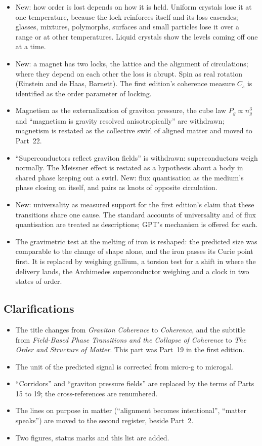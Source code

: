\documentclass[11pt,a4paper]{article}
\begin{document}
\begin{itemize}
\item New: how order is lost depends on how it is held. Uniform crystals lose it at one temperature, because the lock reinforces itself and its loss cascades; glasses, mixtures, polymorphs, surfaces and small particles lose it over a range or at other temperatures. Liquid crystals show the levels coming off one at a time.
\item New: a magnet has two locks, the lattice and the alignment of circulations; where they depend on each other the loss is abrupt. Spin as real rotation (Einstein and de Haas, Barnett). The first edition's coherence measure $C_s$ is identified as the order parameter of locking.
\item Magnetism as the externalization of graviton pressure, the cube law $P_g\propto n_g^3$ and ``magnetism is gravity resolved anisotropically'' are withdrawn; magnetism is restated as the collective swirl of aligned matter and moved to Part~22.
\item ``Superconductors reflect graviton fields'' is withdrawn: superconductors weigh normally. The Meissner effect is restated as a hypothesis about a body in shared phase keeping out a swirl. New: flux quantisation as the medium's phase closing on itself, and pairs as knots of opposite circulation.
\item New: universality as measured support for the first edition's claim that these transitions share one cause. The standard accounts of universality and of flux quantisation are treated as descriptions; GPT's mechanism is offered for each.
\item The gravimetric test at the melting of iron is reshaped: the predicted size was comparable to the change of shape alone, and the iron passes its Curie point first. It is replaced by weighing gallium, a torsion test for a shift in where the delivery lands, the Archimedes superconductor weighing and a clock in two states of order.
\end{itemize}

\subsection*{Clarifications}
\begin{itemize}
\item The title changes from \emph{Graviton Coherence} to \emph{Coherence}, and the subtitle from \emph{Field-Based Phase Transitions and the Collapse of Coherence} to \emph{The Order and Structure of Matter}. This part was Part~19 in the first edition.
\item The unit of the predicted signal is corrected from micro-g to microgal.
\item ``Corridors'' and ``graviton pressure fields'' are replaced by the terms of Parts 15 to 19; the cross-references are renumbered.
\item The lines on purpose in matter (``alignment becomes intentional'', ``matter speaks'') are moved to the second register, beside Part~2.
\item Two figures, status marks and this list are added.
\end{itemize}

\newpage


\end{document}

